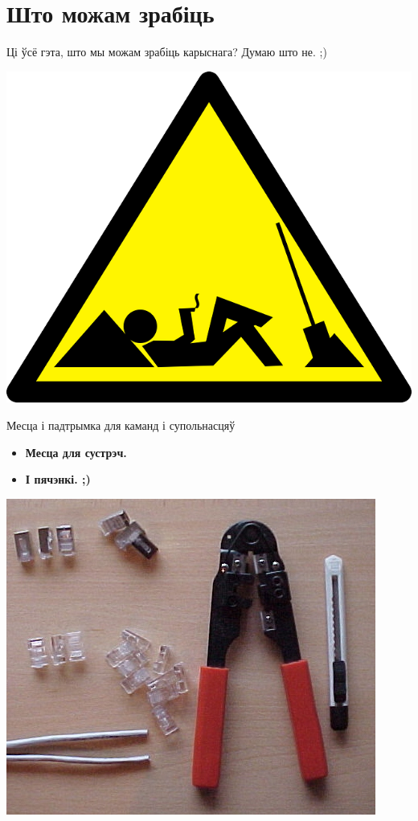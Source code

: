 \documentclass[ignorenonframetext,hyperref={pdftex,unicode}]{beamer}
\begin{document}
\section{Што можам зрабіць}
\begin{frame}{Ці ўсё гэта, што мы можам зрабіць карыснага?} 
	Думаю што не. ;)
	\begin{center}
 		\includegraphics[height=.8\textheight,keepaspectratio]{work-47200_640} 
	\end{center}
\end{frame} %

\begin{frame}{Месца і падтрымка для каманд і супольнасцяў}
	\begin{itemize}
		\item \textbf{Месца для сустрэч.}
			\pause
		\item \textbf{І пячэнкі. ;)}
	\end{itemize}
	\begin{center}
		\includegraphics[width=\textwidth,height=0.8\textheight,keepaspectratio]{Utp_diy_tools}
	\end{center}
\end{frame}
\end{document}
